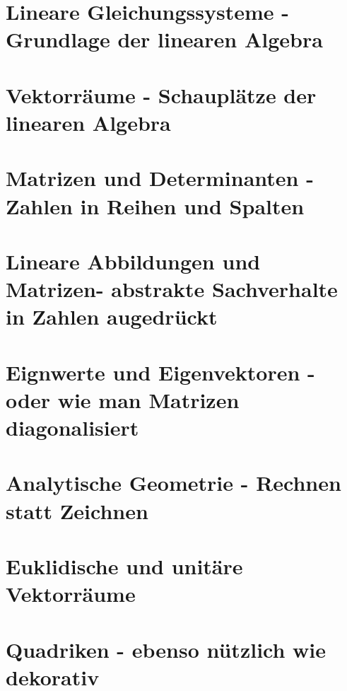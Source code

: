 \documentclass[a4paper]{article}
\begin{document}
\section{Lineare Gleichungssysteme - Grundlage der linearen Algebra}

\section{Vektorräume - Schauplätze der linearen Algebra}

\section{Matrizen und Determinanten - Zahlen in Reihen und Spalten}

\section{Lineare Abbildungen und Matrizen- abstrakte Sachverhalte in Zahlen augedrückt}

\section{Eignwerte und Eigenvektoren - oder wie man Matrizen diagonalisiert}

\section{Analytische Geometrie - Rechnen statt Zeichnen}

\section{Euklidische und unitäre Vektorräume}

\section{Quadriken - ebenso nützlich wie dekorativ}
\end{document}
